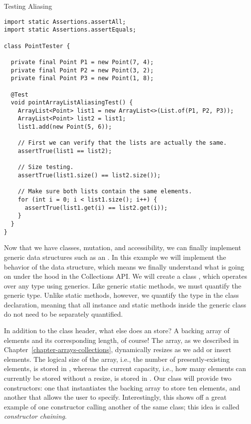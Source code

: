 \begin{cl}{Testing  Aliasing}
\begin{lstlisting}[language=MyJava]
import static Assertions.assertAll;
import static Assertions.assertEquals;

class PointTester {

  private final Point P1 = new Point(7, 4);
  private final Point P2 = new Point(3, 2);
  private final Point P3 = new Point(1, 8);

  @Test
  void pointArrayListAliasingTest() {
    ArrayList<Point> list1 = new ArrayList<>(List.of(P1, P2, P3));
    ArrayList<Point> list2 = list1;
    list1.add(new Point(5, 6));

    // First we can verify that the lists are actually the same.
    assertTrue(list1 == list2);

    // Size testing.
    assertTrue(list1.size() == list2.size());

    // Make sure both lists contain the same elements.
    for (int i = 0; i < list1.size(); i++) {
      assertTrue(list1.get(i) == list2.get(i));
    }
  }
}
\end{lstlisting}
\end{cl}

\example Now that we have classes, mutation, and accessibility, we can finally implement generic data structures such as an . In this example we will implement the behavior of the  data structure, which means we finally understand what is going on under the hood in the Collections API. We will create a class , which operates over any type using generics. Like generic static methods, we must quantify the generic type. Unlike static methods, however, we quantify the type in the class declaration, meaning that all instance and static methods inside the generic class do not need to be separately quantified.

In addition to the class header, what else does an  store? A backing array of elements and its corresponding length, of course! The array, as we described in Chapter~\ref{chapter-arrays-collections}, dynamically resizes as we add or insert elements. The logical size of the array, i.e., the number of presently-existing elements, is stored in , whereas the current capacity, i.e., how many elements can currently be stored without a resize, is stored in . Our class will provide two constructors: one that instantiates the backing array to store ten elements, and another that allows the user to specify. Interestingly, this shows off a great example of one constructor calling another of the same class; this idea is called \textit{constructor chaining}. 

